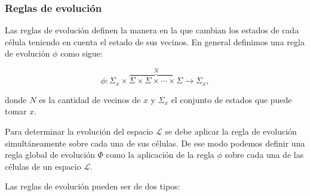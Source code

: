 
\subsubsection{Reglas de evolución}

Las reglas de evolución definen la manera en la que cambian los estados de cada célula teniendo en cuenta el estado de sus vecinos. En general definimos una regla de evolución $\phi$ como sigue:

$$\phi:\Sigma_x\times\overbrace{\Sigma\times\Sigma\times\cdots\times\Sigma}^{N}\longrightarrow\Sigma_x,$$

donde $N$ es la cantidad de vecinos de $x$ y $\Sigma_x$ el conjunto de estados que puede tomar $x$. 

Para determinar la evolución del espacio $\mathcal{L}$ se debe aplicar la regla de evolución simultáneamente sobre cada una de sus células. De ese modo podemos definir una regla global de evolución $\Phi$ como la aplicación de la regla $\phi$ sobre cada una de las células de un espacio $\mathcal{L}$.

Las reglas de evolución pueden ser de dos tipos:

